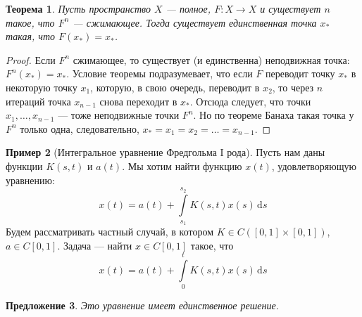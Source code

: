 \documentclass[11pt,openany,a4paper]{scrartcl}
\theoremstyle{plain}
\newtheorem{theorem}{Теорема}[section]
\newtheorem{proposition}[theorem]{Предложение}
\theoremstyle{definition}
\newtheorem{example}[theorem]{Пример}
\newcommand{\dif}{\, \mathrm d}
\begin{document}
\begin{theorem}
    Пусть пространство $X$ — полное, $F: X \to X$ и существует $n$ такое, что
    $F^n$ — сжимающее. Тогда существует единственная точка $x_\ast$ такая, что
    $F(x_\ast) = x_\ast$.
\end{theorem}
\begin{proof}
    Если $F^n$ сжимающее, то существует (и единственна) неподвижная точка:
    $F^n(x_\ast) = x_\ast$.
    Условие теоремы подразумевает, что если $F$ переводит точку $x_\ast$ в
    некоторую точку $x_1$, которую, в свою очередь, переводит в $x_2$, то через
    $n$ итераций точка $x_{n-1}$ снова переходит в $x_\ast$. Отсюда следует,
    что точки $x_1,\ldots,x_{n-1}$ — тоже неподвижные точки $F^n$. Но по теореме
    Банаха такая точка у $F^n$ только одна, следовательно,
    $x_\ast = x_1 = x_2 = \ldots = x_{n-1}$.
\end{proof}
\begin{example}[Интегральное уравнение Фредгольма I рода]
    Пусть нам даны функции $K(s,t)$ и $a(t)$. Мы хотим найти функцию $x(t)$,
    удовлетворяющую уравнению:
    $$
    x(t) = a(t) + \int\limits_{s_1}^{s_2} K(s,t) x(s) \dif s
    $$
    Будем рассматривать частный случай, в котором $K \in C([0,1]\times[0,1])$,
    $a \in C[0,1]$. Задача — найти $x \in C[0,1]$ такое, что
    $$
    x(t) = a(t) + \int\limits_0^t K(s,t) x(s) \dif s
    $$
\end{example}
\begin{proposition}
    Это уравнение имеет единственное решение.
\end{proposition}
\end{document}
